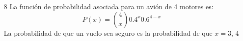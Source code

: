 \documentclass[10pt,letterpaper]{article}
\author{Germán Avendaño Ramírez}
\begin{document}
\begin{itemize}
\item[8] La función de probabilidad asociada para un avi\'{o}n de 4 motores es:
\[P(x)=\displaystyle{4 \choose x}0.4^{x}0.6^{4-x}\]
La probabilidad de que un vuelo sea seguro es la probabilidad de que 
$x=3$, 4
\end{itemize}
\end{document}
